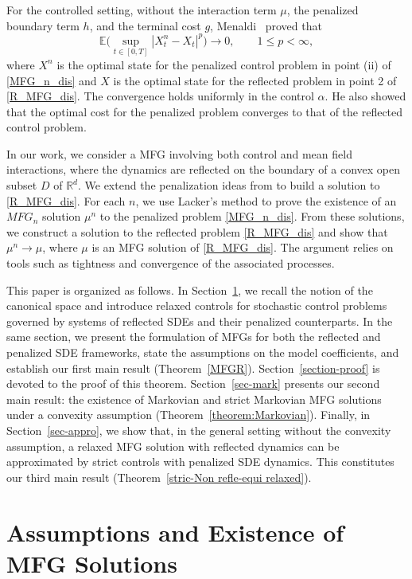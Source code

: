 \documentclass[11pt,amsfonts]{article}
\theoremstyle{plain}
\theoremstyle{assumpstyle}
\numberwithin{equation}{section}
\numberwithin{theorem}{section}
\numberwithin{proposition}{section}
\numberwithin{definition}{section}
\numberwithin{remark}{section}
\numberwithin{corollary}{section}
\numberwithin{lemma}{section}
\begin{document}
For the controlled setting, without the interaction term $\mu$, the penalized boundary term $h$, and the terminal cost $g$, Menaldi~\cite{menaldi} proved that
\begin{equation*}
\mathbb{E}\Big( \sup_{t \in [0,T]} |X_t^n - X_t|^p \Big) \to 0, \qquad 1 \le p < \infty,
\end{equation*}
where $ X^n $ is the optimal state for the penalized control problem in point (ii) of \eqref{MFG_n_dis} and $ X $ is the optimal state for the reflected problem in point 2 of \eqref{R_MFG_dis}. The convergence holds uniformly in the control $ \alpha $. He also showed that the optimal cost for the penalized problem converges to that of the reflected control problem.

In our work, we consider a MFG involving both control and mean field interactions, where the dynamics are reflected on the boundary of a convex open subset $D$ of $\mathbb{R}^d$. We extend the penalization ideas from \cite{Lion-no-cont, menaldi} to build a solution to \eqref{R_MFG_dis}. For each $ n $, we use Lacker’s method \cite{laker} to prove the existence of an $MFG_n$ solution $ \mu^n $ to the penalized problem \eqref{MFG_n_dis}. From these solutions, we construct a solution to the reflected problem \eqref{R_MFG_dis} and show that $ \mu^n \to \mu $, where $\mu $ is an MFG solution of \eqref{R_MFG_dis}. The argument relies on tools such as tightness and convergence of the associated processes.

This paper is organized as follows. In Section~\ref{sec-main-result}, we recall the notion of the canonical space and introduce relaxed controls for stochastic control problems governed by systems of reflected SDEs and their penalized counterparts. In the same section, we present the formulation of MFGs for both the reflected and penalized SDE frameworks, state the assumptions on the model coefficients, and establish our first main result (Theorem~\ref{MFGR}). 
Section~\ref{section-proof} is devoted to the proof of this theorem. 
Section~\ref{sec-mark} presents our second main result: the existence of Markovian and strict Markovian MFG solutions under a convexity assumption (Theorem~\ref{theorem:Markovian}). 
Finally, in Section~\ref{sec-appro}, we show that, in the general setting without the convexity assumption, a relaxed MFG solution with reflected dynamics can be approximated by strict controls with penalized SDE dynamics. This constitutes our third main result (Theorem~\ref{stric-Non refle-equi relaxed}).

\section{Assumptions and Existence of MFG Solutions}\label{sec-main-result}
\end{document}
